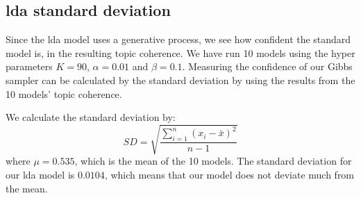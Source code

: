 \subsection{\gls{lda} standard deviation}\label{sec:std_dev}
Since the \gls{lda} model uses a generative process, we see how confident the standard model is, in the resulting topic coherence.
We have run 10 models using the hyper parameters $K=90$, $\alpha=0.01$ and $\beta=0.1$.
Measuring the confidence of our Gibbs sampler can be calculated by the standard deviation by using the results from the 10 models' topic coherence.

We calculate the standard deviation by:
\begin{equation}
	SD = \sqrt{\frac{\sum_{i=1}^{n}(x_i-\bar{x})^2}{n-1}}
\end{equation}
where $\mu = 0.535$, which is the mean of the 10 models.
The standard deviation for our \gls{lda} model is $0.0104$, which means that our model does not deviate much from the mean.
